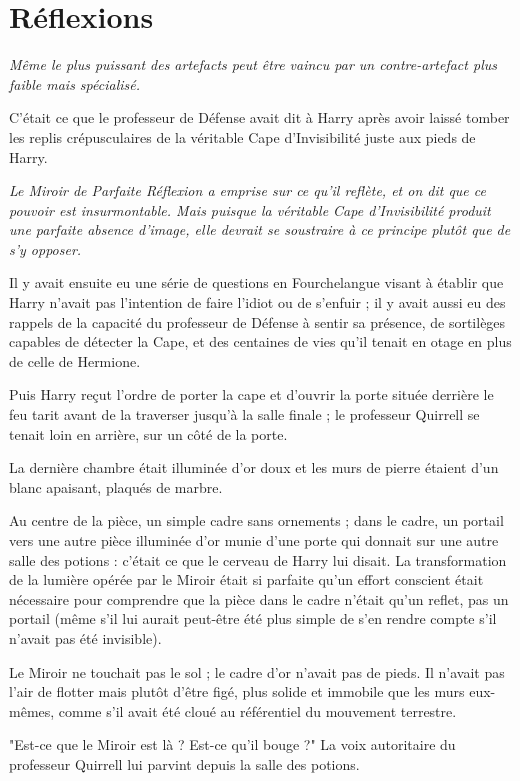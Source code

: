 
\chapter{Réflexions}

\emph{Même le plus puissant des artefacts peut être vaincu par un contre-artefact plus faible mais spécialisé.} 

C'était ce que le professeur de Défense avait dit à Harry après avoir laissé tomber les replis crépusculaires de la véritable Cape d'Invisibilité juste aux pieds de Harry.

\emph{Le Miroir de Parfaite Réflexion a emprise sur ce qu'il reflète, et on dit que ce pouvoir est insurmontable. Mais puisque la véritable Cape d'Invisibilité produit une parfaite absence d'image, elle devrait se soustraire à ce principe plutôt que de s'y opposer.} 

Il y avait ensuite eu une série de questions en Fourchelangue visant à établir que Harry n'avait pas l'intention de faire l'idiot ou de s'enfuir ; il y avait aussi eu des rappels de la capacité du professeur de Défense à sentir sa présence, de sortilèges capables de détecter la Cape, et des centaines de vies qu'il tenait en otage en plus de celle de Hermione.

Puis Harry reçut l'ordre de porter la cape et d'ouvrir la porte située derrière le feu tarit avant de la traverser jusqu'à la salle finale ; le professeur Quirrell se tenait loin en arrière, sur un côté de la porte.

La dernière chambre était illuminée d'or doux et les murs de pierre étaient d'un blanc apaisant, plaqués de marbre.

Au centre de la pièce, un simple cadre sans ornements ; dans le cadre, un portail vers une autre pièce illuminée d'or munie d'une porte qui donnait sur une autre salle des potions : c'était ce que le cerveau de Harry lui disait. La transformation de la lumière opérée par le Miroir était si parfaite qu'un effort conscient était nécessaire pour comprendre que la pièce dans le cadre n'était qu'un reflet, pas un portail (même s'il lui aurait peut-être été plus simple de s'en rendre compte s'il n'avait pas été invisible).

Le Miroir ne touchait pas le sol ; le cadre d'or n'avait pas de pieds. Il n'avait pas l'air de flotter mais plutôt d'être figé, plus solide et immobile que les murs eux-mêmes, comme s'il avait été cloué au référentiel du mouvement terrestre.

"Est-ce que le Miroir est là ? Est-ce qu'il bouge ?" La voix autoritaire du professeur Quirrell lui parvint depuis la salle des potions.

